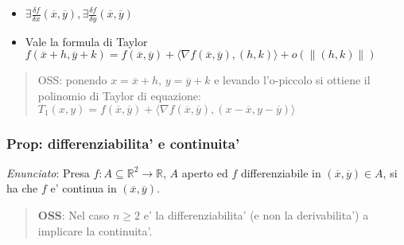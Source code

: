 \documentclass{article}
\begin{document}
\begin{itemize}
  \item $\exists \frac{\delta f}{\delta x}(\overline{x}, \overline{y}), \exists \frac{\delta f}{\delta y}(\overline{x}, \overline{y})$
  \item Vale la formula di Taylor $f(\overline{x}+h, \overline{y}+k) = f(\overline{x},\overline{y}) + \langle 
    \nabla f(\overline{x}, \overline{y}), (h,k) \rangle +
    o(\|(h, k)\|)$
\end{itemize}

\begin{quote}
  OSS: ponendo $x = \overline{x} + h$, $y = \overline{y} + k$ e levando l'o-piccolo
  si ottiene il polinomio di Taylor  di equazione: $T_1(x, y) = f(\overline{x},
  \overline{y}) + \langle \nabla f(\overline{x}, \overline{y}), (x - \overline{x},
  y - \overline{y}) \rangle$
\end{quote}

\subsubsection{Prop: differenziabilita' e continuita'}

\emph{Enunciato}: Presa $f: A \subseteq \mathbb{R}^2 \to \mathbb{R}$, $A$ aperto
ed $f$ differenziabile in $(\overline{x}, \overline{y}) \in A$, si ha che $f$ e'
continua in $(\overline{x}, \overline{y})$. \\

\begin{quote}
  \textbf{OSS}: Nel caso $n \geq 2$ e' la differenziabilita' (e non la derivabilita')
  a implicare la continuita'.
\end{quote}
\end{document}

